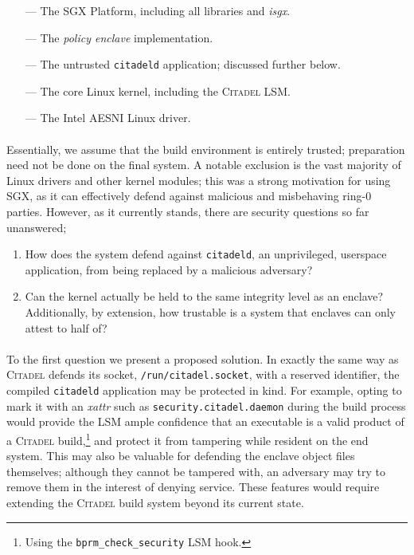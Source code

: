 \begin{itemize}
    \item[---] The SGX Platform, including all libraries and \textit{isgx}. 
    \item[---] The \textit{policy enclave} implementation.
    \item[---] The untrusted \texttt{citadeld} application; discussed further below.
    \item[---] The core Linux kernel, including the \textsc{Citadel} LSM.   
    \item[---] The Intel AESNI Linux driver. 
\end{itemize}

\paragraph{} Essentially, we assume that the build environment is entirely trusted; preparation need not be done on the final system. A notable exclusion is the vast majority of Linux drivers and other kernel modules; this was a strong motivation for using SGX, as it can effectively defend against malicious and misbehaving ring-0 parties. However, as it currently stands, there are security questions so far unanswered;

\begin{enumerate}
    \item How does the system defend against \texttt{citadeld}, an unprivileged, userspace application, from being replaced by a malicious adversary?
    \item Can the kernel actually be held to the same integrity level as an enclave? Additionally, by extension, how trustable is a system that enclaves can only attest to half of?
\end{enumerate}

\paragraph{} To the first question we present a proposed solution. In exactly the same way as \textsc{Citadel} defends its socket, \texttt{/run/citadel.socket}, with a reserved identifier, the compiled \texttt{citadeld} application may be protected in kind. For example, opting to mark it with an \textit{xattr} such as \texttt{security.citadel.daemon} during the build process would provide the LSM ample confidence that an executable is a valid product of a \textsc{Citadel} build,\footnote{Using the \texttt{bprm\_check\_security} LSM hook.} and protect it from tampering while resident on the end system. This may also be valuable for defending the enclave object files themselves; although they cannot be tampered with, an adversary may try to remove them in the interest of denying service. These features would require extending the \textsc{Citadel} build system beyond its current state.

